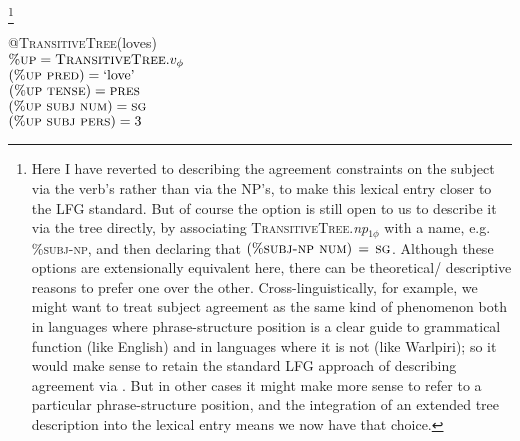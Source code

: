 \documentclass[output=paper,hidelinks]{langscibook}
\begin{document}
\footnote{Here I have reverted to describing the agreement constraints on the
  subject via the verb's \fstruc{} rather than via the NP's, to make this
  lexical entry closer to the LFG standard. But of course the option is still
  open to us to describe it via the tree directly, by associating
  \textsc{TransitiveTree}.\textit{np}$_{1\phi}$ with a name, e.g. \%\textsc{subj-np},
  and then declaring that \mbox{$(\%\textsc{subj-np num})\,=\,\textsc{sg}$}. Although
  these options are extensionally equivalent here, there can be theoretical\slash
  descriptive reasons to prefer one over the other. Cross-linguistically, for
  example, we might want to treat subject agreement as the same kind of
  phenomenon both in languages where phrase-structure position is a clear guide
  to grammatical function (like English) and in languages where it is not (like
  Warlpiri); so it would make sense to retain the standard LFG approach of
  describing agreement via \fstruc. But in other cases it might make more sense
  to refer to a particular phrase-structure position, and the integration of an
  extended tree description into the lexical entry means we now have that
  choice.}
%

\ea\label{ex:TAG:43}
@\textsc{TransitiveTree}(loves)\\
$\%\textsc{up} = \textsc{TransitiveTree}.v_\phi$\\
$(\%\textsc{up}\ \textsc{pred}{}) = \textrm{`love'}$\\
$(\%\textsc{up}\ \textsc{tense}{}) = \textsc{pres} $\\
$(\%\textsc{up}\ \textsc{subj}{}\ \textsc{num}{}) = \textsc{sg}{} $\\
$(\%\textsc{up}\ \textsc{subj}{}\ \textsc{pers}{}) = 3 $
\z
\end{document}

